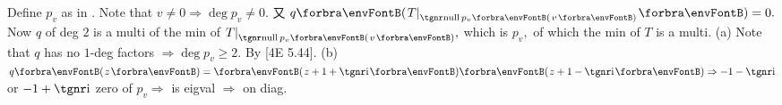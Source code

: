 
%


Define $p_v$ as in . Note that $v\neq0\Rightarrow\deg p_v\neq0.$ 又 $q\Par{T\mmid_{\nullp p_v\SmallPar{v}}}=0.$\parSol{}
Now $q$ of deg $2$ is a multi of the min of $T\mmid_{\nullp p_v\SmallPar{v}},$ which is $p_v,$ of which the min of $T$ is a multi.\parSol{}
(a) Note that $q$ has no $1$\hspace{1pt}-\hspace{1pt}deg factors $\Rightarrow\deg p_v\geqslant 2.$ By [4E 5.44].\parSol{}
(b) $q\Par{z}=\Par{z+1+\i}\Par{z+1-\i}\Rightarrow -1-\i$ or $-1+\i$ zero of $p_v\Rightarrow$ is eigval $\Rightarrow$ on diag.\PfEnd
\SepLine

